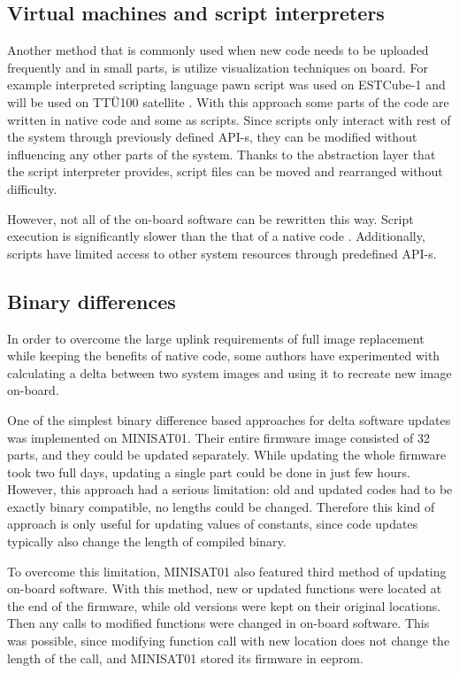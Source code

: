 \subsection{Virtual machines and script interpreters}

Another method that is commonly used when new code needs to be uploaded frequently and in small parts, is utilize visualization techniques on board. For example interpreted scripting language pawn script was used on ESTCube-1 \cite{Suenter2016} and will be used on TTÜ100 satellite \cite{Aasavaeli2017}. With this approach some parts of the code are written in native code and some as scripts. Since scripts only interact with rest of the system through previously defined API-s, they can be modified without influencing any other parts of the system. Thanks to the abstraction layer that the script interpreter provides, script files can be moved and rearranged without difficulty. 

However, not all of the on-board software can be rewritten this way. Script execution is significantly slower than the that of a native code . Additionally, scripts have limited access to other system resources through predefined API-s.


\subsection{Binary differences}

In order to overcome the large uplink requirements of full image replacement while keeping the benefits of native code, some authors have experimented with calculating a delta between two system images and using it to recreate new image on-board.

One of the simplest binary difference based approaches for delta software updates was implemented on MINISAT01. Their entire firmware image consisted of 32 parts, and they could be updated separately. While updating the whole firmware took two full days, updating a single part could be done in just few hours. However, this approach had a serious limitation: old and updated codes had to be exactly binary compatible, no lengths could be changed. Therefore this kind of approach is only useful for updating values of constants, since code updates typically also change the length of compiled binary. \cite{Garrido1998}

To overcome this limitation, MINISAT01 also featured third method of updating on-board software. With this method, new or updated functions were located at the end of the firmware, while old versions were kept on their original locations. Then any calls to modified functions were changed in on-board software. This was possible, since modifying function call with new location does not change the length of the call, and MINISAT01 stored its firmware in \gls{eeprom}. \cite{Garrido1998} 

